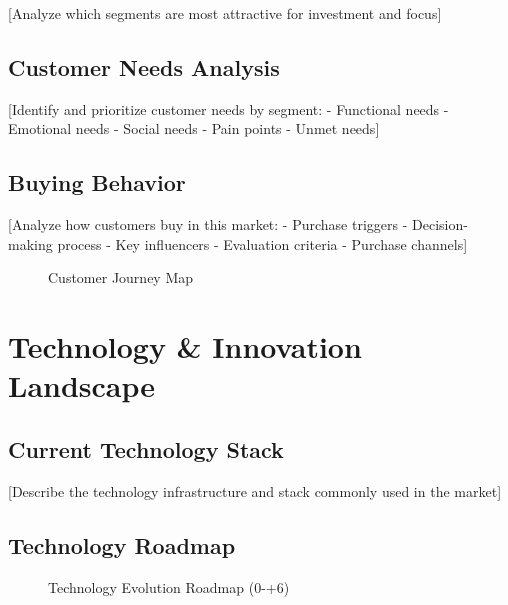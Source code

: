 \documentclass[11pt,letterpaper]{report}
\newcommand{\baseyear}{0}
\newcommand{\yr}[1]{\the\numexpr\baseyear+#1\relax}       %
\begin{document}
[Analyze which segments are most attractive for investment and focus]

\section{Customer Needs Analysis}

[Identify and prioritize customer needs by segment:
- Functional needs
- Emotional needs
- Social needs
- Pain points
- Unmet needs]

\section{Buying Behavior}

[Analyze how customers buy in this market:
- Purchase triggers
- Decision-making process
- Key influencers
- Evaluation criteria
- Purchase channels]


\begin{figure}[htbp]
\centering
\caption{Customer Journey Map}
\label{fig:customer_journey}
\end{figure}

\chapter{Technology \& Innovation Landscape}

\section{Current Technology Stack}

[Describe the technology infrastructure and stack commonly used in the market]

\section{Technology Roadmap}


\begin{figure}[htbp]
\centering
\caption{Technology Evolution Roadmap (\baseyear{}-\yr{6})}
\label{fig:tech_roadmap}
\end{figure}
\end{document}
